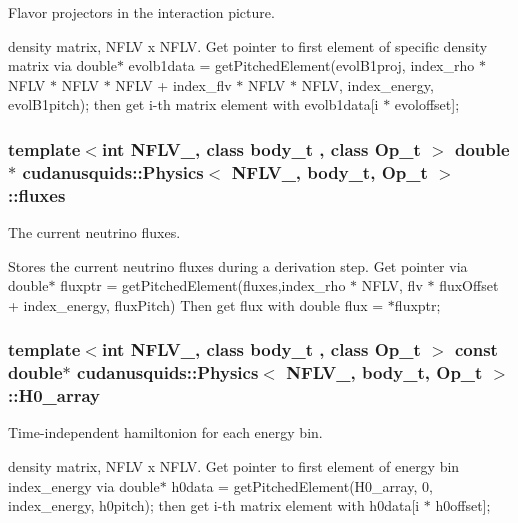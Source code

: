 Flavor projectors in the interaction picture. 

density matrix, N\+F\+LV x N\+F\+LV. Get pointer to first element of specific density matrix via double$\ast$ evolb1data = get\+Pitched\+Element(evol\+B1proj, index\+\_\+rho $\ast$ N\+F\+LV $\ast$ N\+F\+LV $\ast$ N\+F\+LV + index\+\_\+flv $\ast$ N\+F\+LV $\ast$ N\+F\+LV, index\+\_\+energy, evol\+B1pitch); then get i-\/th matrix element with evolb1data\mbox{[}i $\ast$ evoloffset\mbox{]}; 
\subsubsection[{\texorpdfstring{fluxes}{fluxes}}]{\setlength{\rightskip}{0pt plus 5cm}template$<$int N\+F\+L\+V\+\_\+, class body\+\_\+t , class Op\+\_\+t $>$ double$\ast$ {\bf cudanusquids\+::\+Physics}$<$ N\+F\+L\+V\+\_\+, body\+\_\+t, Op\+\_\+t $>$\+::fluxes}\hypertarget{structcudanusquids_1_1Physics_a6a86acb042107ec61f397148f58ebd3b}{}\label{structcudanusquids_1_1Physics_a6a86acb042107ec61f397148f58ebd3b}


The current neutrino fluxes. 

Stores the current neutrino fluxes during a derivation step. Get pointer via double$\ast$ fluxptr = get\+Pitched\+Element(fluxes,index\+\_\+rho $\ast$ N\+F\+LV, flv $\ast$ flux\+Offset + index\+\_\+energy, flux\+Pitch) Then get flux with double flux = $\ast$fluxptr; 
\subsubsection[{\texorpdfstring{H0\+\_\+array}{H0_array}}]{\setlength{\rightskip}{0pt plus 5cm}template$<$int N\+F\+L\+V\+\_\+, class body\+\_\+t , class Op\+\_\+t $>$ const double$\ast$ {\bf cudanusquids\+::\+Physics}$<$ N\+F\+L\+V\+\_\+, body\+\_\+t, Op\+\_\+t $>$\+::H0\+\_\+array}\hypertarget{structcudanusquids_1_1Physics_a8214408e1b93e64ccd5e0ccad05627bf}{}\label{structcudanusquids_1_1Physics_a8214408e1b93e64ccd5e0ccad05627bf}


Time-\/independent hamiltonion for each energy bin. 

density matrix, N\+F\+LV x N\+F\+LV. Get pointer to first element of energy bin index\+\_\+energy via double$\ast$ h0data = get\+Pitched\+Element(\+H0\+\_\+array, 0, index\+\_\+energy, h0pitch); then get i-\/th matrix element with h0data\mbox{[}i $\ast$ h0offset\mbox{]}; 
